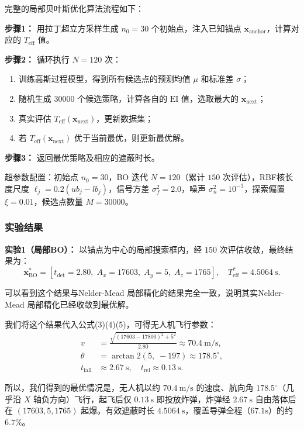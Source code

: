 \documentclass{ctexart}
\begin{document}
完整的局部贝叶斯优化算法流程如下：

\textbf{步骤1：} 用拉丁超立方采样生成 $n_0=30$ 个初始点，注入已知锚点 $\mathbf{x}_{\text{anchor}}$，计算对应的 $T_{\text{eff}}$ 值。

\textbf{步骤2：} 循环执行 $N=120$ 次：
\begin{enumerate}
    \item 训练高斯过程模型，得到所有候选点的预测均值 $\mu$ 和标准差 $\sigma$；
    \item 随机生成 $30000$ 个候选策略，计算各自的 $\mathrm{EI}$ 值，选取最大的 $\mathbf{x}_{\text{next}}$；
    \item 真实评估 $T_{\text{eff}}(\mathbf{x}_{\text{next}})$，更新数据集；
    \item 若 $T_{\text{eff}}(\mathbf{x}_{\text{next}})$ 优于当前最优，则更新最优解。
\end{enumerate}

\textbf{步骤3：} 返回最优策略及相应的遮蔽时长。

超参数配置：初始点 $n_0=30$，BO 迭代 $N=120$（累计 $150$ 次评估），RBF核长度尺度 $\ell_j=0.2(ub_j-lb_j)$，信号方差 $\sigma_f^2=2.0$，噪声 $\sigma_n^2=10^{-3}$，探索偏置 $\xi=0.01$，候选点数量 $M=30000$。

\subsubsection{实验结果}

\textbf{实验1（局部BO）：} 以锚点为中心的局部搜索框内，经 $150$ 次评估收敛，最终结果为：
\[
\mathbf{x}^*_{\text{BO}} = [t_{\text{det}} = 2.80,\; A_x = 17603,\; A_y = 5,\; A_z = 1765], \quad T_{\text{eff}}^* = 4.5064\ \mathrm{s}.
\]

可以看到这个结果与Nelder-Mead 局部精化的结果完全一致，说明其实Nelder-Mead 局部精化已经收敛到最优解。

我们将这个结果代入公式(3)(4)(5)，可得无人机飞行参数：
\begin{align*}
v &= \frac{\sqrt{(17603-17800)^2 + 5^2}}{2.80} \approx 70.4\ \mathrm{m/s}, \\
\theta &= \arctan2(5,\; -197) \approx 178.5^\circ, \\
t_{\text{fall}} &\approx 2.67\ \mathrm{s}, \quad t_{\text{rel}} \approx 0.13\ \mathrm{s}.
\end{align*}

所以，我们得到的最优情况是，无人机以约 $70.4\ \mathrm{m/s}$ 的速度、航向角 $178.5^\circ$（几乎沿 $X$ 轴负方向）飞行，起飞后仅 $0.13\ \mathrm{s}$ 即投放炸弹，炸弹经 $2.67\ \mathrm{s}$ 自由落体后在 $(17603,5,1765)$ 起爆。有效遮蔽时长 $4.5064\ \mathrm{s}$，覆盖导弹全程（$67.1\mathrm{s}$）的约 $6.7\%$。
\end{document}
